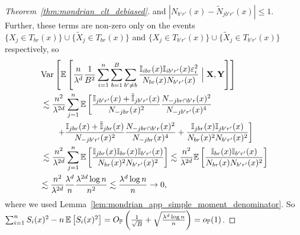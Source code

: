 \begin{proof}[Theorem~\ref{thm:mondrian_clt_debiased}]
  and $|N_{b' r'}(x) - \tilde N_{j b' r'}(x)| \leq 1$.
  Further, these terms are non-zero only on the events
  $\{ X_j \in T_{b r}(x) \} \cup \{ \tilde X_j \in T_{b r}(x) \}$
  and $\{ X_j \in T_{b' r'}(x) \} \cup \{ \tilde X_j \in T_{b' r'}(x) \}$
  respectively, so
  \begin{align*}
    &\operatorname{Var} \left[
      \mathbb{E} \left[
        \frac{n}{\lambda^d}
        \frac{1}{B^2}
        \sum_{i=1}^n
        \sum_{b=1}^B
        \sum_{b' \neq b}
        \frac{\mathbb{I}_{i b r}(x) \mathbb{I}_{i b' r'}(x) \varepsilon_i^2}
        {N_{b r}(x) N_{b' r'}(x)}
        \Bigm| \mathbf{X}, \mathbf{Y}
      \right]
    \right] \\
    &\, \lesssim
    \frac{n^2}{\lambda^{2d}}
    \sum_{j=1}^{n}
    \mathbb{E} \left[
      \frac{\mathbb{I}_{j b' r'}(x) + \tilde {\mathbb{I}}_{j b' r'}(x)}{N_{-j b r}(x)^2}
      \frac{N_{-j b r \cap b' r}(x)^2} {N_{-j b' r'}(x)^4}
      \right. \\
      &\left.
      \qquad+
      \frac{\mathbb{I}_{j b r}(x) + \tilde {\mathbb{I}}_{j b r}(x)}{N_{-j b' r'}(x)^2}
      \frac{N_{-j b r \cap b' r}(x)^2} {N_{-j b r}(x)^4}
      +
      \frac{\mathbb{I}_{j b r}(x) \mathbb{I}_{j b' r'}(x)}
      {N_{b r}(x)^2 N_{b' r'}(x)^2}
    \right] \\
    &\, \lesssim
    \frac{n^2}{\lambda^{2d}}
    \sum_{j=1}^{n}
    \mathbb{E} \left[
      \frac{\mathbb{I}_{j b r}(x) \mathbb{I}_{b r}(x) \mathbb{I}_{b' r'}(x)}
      {N_{b r}(x)^2 N_{b' r'}(x)^2}
    \right]
    \lesssim
    \frac{n^2}{\lambda^{2d}}
    \mathbb{E} \left[
      \frac{\mathbb{I}_{b r}(x) \mathbb{I}_{b' r'}(x)}
      {N_{b r}(x) N_{b' r'}(x)^2}
    \right] \\
    &\lesssim
    \frac{n^2}{\lambda^{2d}}
    \frac{\lambda^d}{n}
    \frac{\lambda^{2d} \log n}{n^2}
    \lesssim
    \frac{\lambda^d \log n}{n}
    \to 0,
  \end{align*}
  where we used Lemma~\ref{lem:mondrian_app_simple_moment_denominator}.
  So
  $\sum_{i=1}^{n} S_i(x)^2 - n \,\mathbb{E} \left[ S_i(x)^2 \right]
  = O_{\mathbb{P}} \left( \frac{1}{\sqrt B} + \sqrt{\frac{\lambda^d \log n}{n}} \right)
  = o_{\mathbb{P}}(1)$.


\end{proof}
